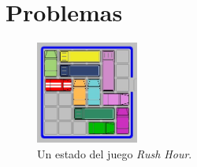 \section{Problemas}
\begin{figure}[htpb!]
  \begin{center}
    \includegraphics[width=0.3\textwidth]{images/rushhour.jpg}
  \end{center}
  \caption{Un estado del juego \textit{Rush Hour}.}
  \label{fig:Ch2rush}
\end{figure}
